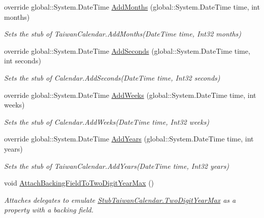 \begin{DoxyCompactItemize}
override global\-::\-System.\-Date\-Time \hyperlink{class_system_1_1_globalization_1_1_fakes_1_1_stub_taiwan_calendar_a15cf6bb7e0805273192d2e2b230d5b85}{Add\-Months} (global\-::\-System.\-Date\-Time time, int months)
\begin{DoxyCompactList}\small\item\em Sets the stub of Taiwan\-Calendar.\-Add\-Months(\-Date\-Time time, Int32 months)\end{DoxyCompactList}\item 
override global\-::\-System.\-Date\-Time \hyperlink{class_system_1_1_globalization_1_1_fakes_1_1_stub_taiwan_calendar_a29c9d012e1961b75c589c95577853d2b}{Add\-Seconds} (global\-::\-System.\-Date\-Time time, int seconds)
\begin{DoxyCompactList}\small\item\em Sets the stub of Calendar.\-Add\-Seconds(\-Date\-Time time, Int32 seconds)\end{DoxyCompactList}\item 
override global\-::\-System.\-Date\-Time \hyperlink{class_system_1_1_globalization_1_1_fakes_1_1_stub_taiwan_calendar_a0422513a60184e28270c5028fa4d3e3f}{Add\-Weeks} (global\-::\-System.\-Date\-Time time, int weeks)
\begin{DoxyCompactList}\small\item\em Sets the stub of Calendar.\-Add\-Weeks(\-Date\-Time time, Int32 weeks)\end{DoxyCompactList}\item 
override global\-::\-System.\-Date\-Time \hyperlink{class_system_1_1_globalization_1_1_fakes_1_1_stub_taiwan_calendar_ad0c257c82cc6a0bce995d97b6ba5f7a2}{Add\-Years} (global\-::\-System.\-Date\-Time time, int years)
\begin{DoxyCompactList}\small\item\em Sets the stub of Taiwan\-Calendar.\-Add\-Years(\-Date\-Time time, Int32 years)\end{DoxyCompactList}\item 
void \hyperlink{class_system_1_1_globalization_1_1_fakes_1_1_stub_taiwan_calendar_aeba6145330023508654add240311055f}{Attach\-Backing\-Field\-To\-Two\-Digit\-Year\-Max} ()
\begin{DoxyCompactList}\small\item\em Attaches delegates to emulate \hyperlink{class_system_1_1_globalization_1_1_fakes_1_1_stub_taiwan_calendar_a9cd944494d9863c97bfa0b229f4434f1}{Stub\-Taiwan\-Calendar.\-Two\-Digit\-Year\-Max} as a property with a backing field.\end{DoxyCompactList}\item 

\end{DoxyCompactItemize}
